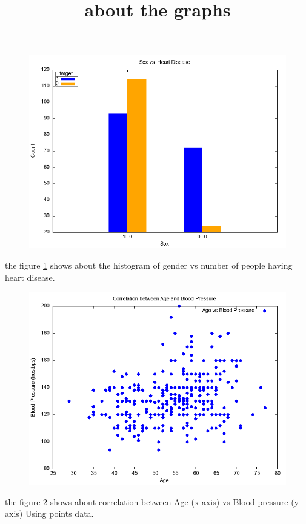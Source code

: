 \documentclass{article}
\title{about the graphs}
\date{}
\begin{document}
	\maketitle
	\begin{figure}[H]
		\includegraphics[width=\textwidth]{4A.png}
		\label{fig:gender vs number}
	\end{figure}
	the figure \ref{fig:gender vs number} shows about the histogram of gender vs number of people having heart disease. 
	\begin{figure}[H]
		\includegraphics[width=\textwidth]{4B.png}
		\label{fig: Age  vs Blood pressure}
	\end{figure}
	the figure \ref{fig: Age  vs Blood pressure} shows about correlation between Age (x-axis) vs Blood pressure (y-axis) Using points data.
\end{document}
